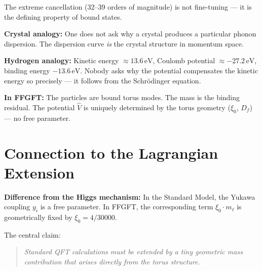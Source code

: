 The extreme cancellation (32–39 orders of magnitude) is not fine-tuning
— it is the defining property of bound states.

\textbf{Crystal analogy:} One does not ask why a crystal produces a
particular phonon dispersion. The dispersion curve \emph{is} the crystal
structure in momentum space.

\textbf{Hydrogen analogy:} Kinetic energy $\approx 13.6\,\text{eV}$,
Coulomb potential $\approx -27.2\,\text{eV}$, binding energy $-13.6\,\text{eV}$.
Nobody asks why the potential compensates the kinetic energy so precisely —
it follows from the Schrödinger equation.

\textbf{In FFGFT:} The particles are bound torus modes. The mass is
the binding residual. The potential $\hat{V}$ is uniquely determined by
the torus geometry ($\xi_0$, $D_f$) — no free parameter.

\section{Connection to the Lagrangian Extension}

\begin{center}
{\scriptsize
{}}
\end{center}

\textbf{Difference from the Higgs mechanism:}
In the Standard Model, the Yukawa coupling $y_i$ is a free parameter.
In FFGFT, the corresponding term $\xi_0 \cdot m_\ell$ is geometrically
fixed by $\xi_0 = 4/30000$.

The central claim:
\begin{quote}
\emph{Standard QFT calculations must be extended by a tiny geometric
mass contribution that arises directly from the torus structure.}
\end{quote}

